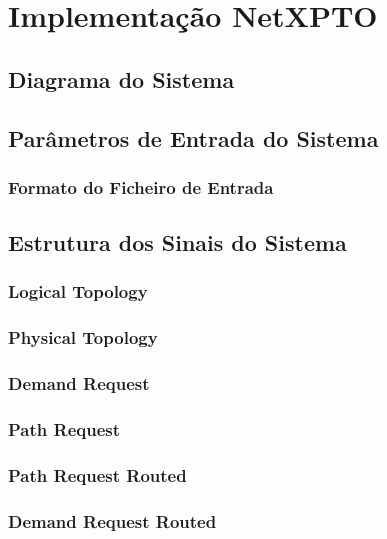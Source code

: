 \chapter{Implementação NetXPTO}
\label{chapter4}

\section{Diagrama do Sistema}

\section{Parâmetros de Entrada do Sistema}
\label{ips}

\subsection{Formato do Ficheiro de Entrada}

\section{Estrutura dos Sinais do Sistema}
\label{tss}

\subsection{Logical Topology}

\subsection{Physical Topology}

\subsection{Demand Request}

\subsection{Path Request}

\subsection{Path Request Routed}

\subsection{Demand Request Routed}

